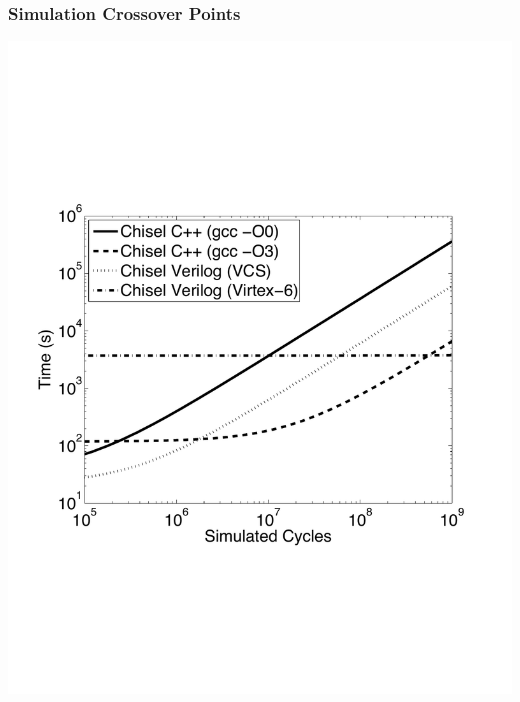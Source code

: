 \documentclass[xcolor=pdflatex,dvipsnames,table]{beamer}
\begin{document}
\begin{frame}
\frametitle{Simulation Crossover Points}

% 

\begin{center}
\includegraphics[height=0.8\textheight]{figs/perf.pdf}
\end{center}


\end{frame}
\end{document}
